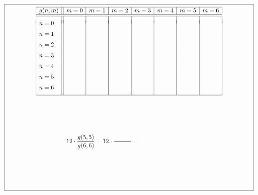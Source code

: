 \documentclass[11pt,a4paper]{article}
\begin{document}
$$\framebox[14.5cm]{\begin{minipage}{14cm}
$$\begin{array}{|l||l|l|l|l|l|l|l|}
\hline
g(n,m)& m = 0 & m = 1 & m = 2 & m = 3 & m = 4 & m = 5 & m = 6 \\
\hline
\hline
      & & & & & & & \\[-2mm]
n = 0 & & & & & & & \\[2mm]
n = 1 & & & & & & & \\[2mm]
n = 2 & & & & & & & \\[2mm]
n = 3 & & & & & & & \\[2mm]
n = 4 & & & & & & & \\[2mm]
n = 5 & & & & & & & \\[2mm]
n = 6 & & & & & & & \\[2mm]
\hline
\end{array}$$
\vspace*{2cm}

$$ 12\cdot\frac{g(5,5)}{g(6,6)} = 12\cdot\frac{\makebox[1cm]{}}{\makebox[1cm]{}} = \makebox[3cm]{}$$
\vspace*{2cm}

\end{minipage}}$$

\label{fini}
\end{document}
